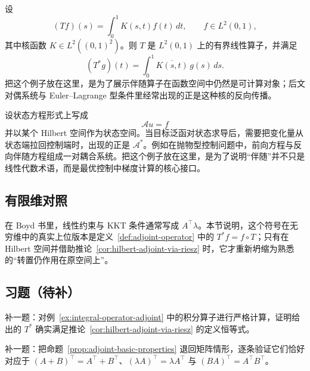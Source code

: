 \begin{example}[积分算子的伴随]\label{ex:integral-operator-adjoint}
设
\[
(Tf)(s)=\int_0^1 K(s,t)f(t)\,dt,
\qquad f\in L^2(0,1),
\]
其中核函数 $K\in L^2((0,1)^2)$。则 $T$ 是 $L^2(0,1)$ 上的有界线性算子，并满足
\[
(T^\ast g)(t)=\int_0^1 \overline{K(s,t)}\,g(s)\,ds.
\]
把这个例子放在这里，是为了展示伴随算子在函数空间中仍然是可计算对象；后文对偶系统与 Euler--Lagrange 型条件里经常出现的正是这种核的反向传播。
\end{example}

\begin{example}\label{ex:pde-adjoint}
设状态方程形式上写成
\[
\mathcal A u = f
\]
并以某个 Hilbert 空间作为状态空间。当目标泛函对状态求导后，需要把变化量从状态端拉回控制端时，出现的正是 $\mathcal A^\ast$。例如在抛物型控制问题中，前向方程与反向伴随方程组成一对耦合系统。把这个例子放在这里，是为了说明“伴随”并不只是线性代数术语，而是最优控制中梯度计算的核心接口。
\end{example}

\subsection*{有限维对照}

在 Boyd 书里，线性约束与 KKT 条件通常写成 $A^\top \lambda$。本节说明，这个符号在无穷维中的真实上位版本是定义~\ref{def:adjoint-operator} 中的 $T^\ast f=f\circ T$；只有在 Hilbert 空间并借助推论~\ref{cor:hilbert-adjoint-via-riesz} 时，它才重新坍缩为熟悉的“转置仍作用在原空间上”。

\subsection*{习题（待补）}

\begin{exercise}[积分核伴随占位]\label{exr:integral-adjoint-placeholder}
补一题：对例~\ref{ex:integral-operator-adjoint} 中的积分算子进行严格计算，证明给出的 $T^\ast$ 确实满足推论~\ref{cor:hilbert-adjoint-via-riesz} 的定义恒等式。
\end{exercise}

\begin{exercise}[有限维桥接题占位]\label{exr:transpose-bridge-placeholder}
补一题：把命题~\ref{prop:adjoint-basic-properties} 退回矩阵情形，逐条验证它们恰好对应于 $(A+B)^\top=A^\top+B^\top$、$(\lambda A)^\top=\lambda A^\top$ 与 $(BA)^\top=A^\top B^\top$。
\end{exercise}
